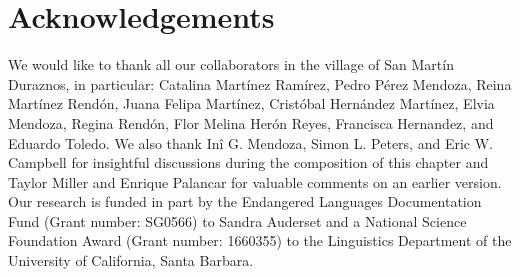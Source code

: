 \documentclass[output=paper]{langscibook}
\begin{document}
\section*{Acknowledgements}

We would like to thank all our collaborators in the village of San Martín Duraznos, in particular: Catalina Martínez Ramírez, Pedro Pérez Mendoza, Reina Martínez Rendón, Juana Felipa Martínez, Cristóbal Hernández Martínez, Elvia Mendoza, Regina Rendón, Flor Melina Herón Reyes, Francisca Hernandez, and Eduardo Toledo. 
We also thank Inî G. Mendoza, Simon L. Peters, and Eric W. Campbell for insightful discussions during the composition of this chapter and Taylor Miller and Enrique Palancar for valuable comments on an earlier version.
Our research is funded in part by the Endangered Languages Documentation Fund (Grant number: SG0566) to Sandra Auderset and a National Science Foundation Award (Grant number: 1660355) to the Linguistics Department of the University of California, Santa Barbara.



\printglossary

{\sloppy\printbibliography[heading=subbibliography,notkeyword=this]}
\end{document}
